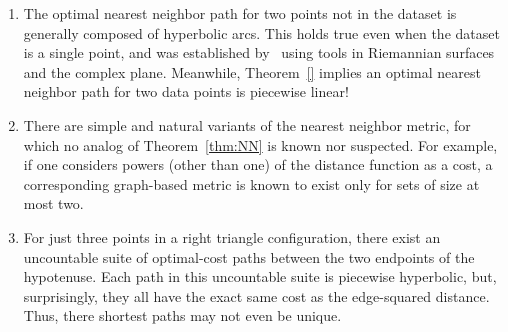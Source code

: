 \begin{enumerate}

\item The optimal nearest neighbor path for two points not in the dataset
is generally composed of hyperbolic arcs.
This holds true even when the dataset is a single point, and was established by~\cite{} using tools in Riemannian surfaces and the complex plane.
Meanwhile, Theorem~\ref{} implies an optimal nearest neighbor path for two data points is piecewise linear!

\item There are simple and natural variants of the nearest neighbor metric, for which no analog of Theorem~\ref{thm:NN} is known nor suspected.
For example, if one considers powers (other than one) of the distance function as a cost, a corresponding graph-based metric is known to exist only for sets of size at most two.

\item For just three points in a right triangle configuration, there exist an uncountable suite of optimal-cost paths between the two endpoints of the hypotenuse.
Each path in this uncountable suite is piecewise hyperbolic, but, surprisingly, they all have the exact same cost as the edge-squared distance.
Thus, there shortest paths may not even be unique.



\end{enumerate}
